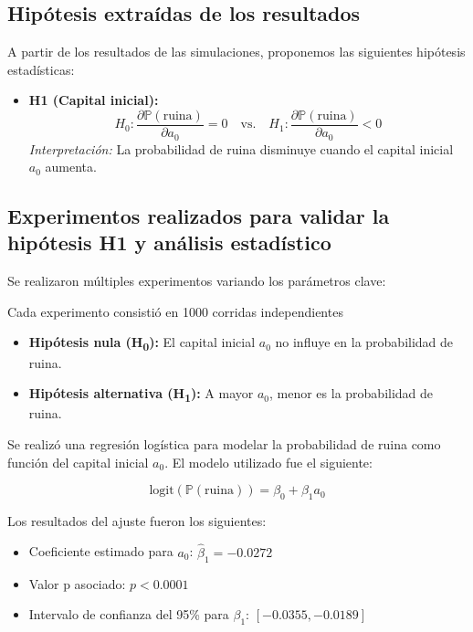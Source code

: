 \documentclass{article}
\begin{document}
\subsection{Hipótesis extraídas de los resultados}

A partir de los resultados de las simulaciones, proponemos las siguientes hipótesis estadísticas:

\begin{itemize}
    \item \textbf{H1 (Capital inicial):}
    \[
    H_0: \frac{\partial \mathbb{P}(\text{ruina})}{\partial a_0} = 0 
    \quad \text{vs.} \quad 
    H_1: \frac{\partial \mathbb{P}(\text{ruina})}{\partial a_0} < 0
    \]
    \textit{Interpretación:} La probabilidad de ruina disminuye cuando el capital inicial \( a_0 \) aumenta.
\end{itemize}

\subsection{Experimentos realizados para validar la hipótesis H1 y análisis estadístico}

Se realizaron múltiples experimentos variando los parámetros clave:


Cada experimento consistió en 1000 corridas independientes

\begin{itemize}
    \item \textbf{Hipótesis nula (H\textsubscript{0}):} El capital inicial \( a_0 \) no influye en la probabilidad de ruina.
    \item \textbf{Hipótesis alternativa (H\textsubscript{1}):} A mayor \( a_0 \), menor es la probabilidad de ruina.
\end{itemize}

Se realizó una regresión logística para modelar la probabilidad de ruina como función del capital inicial \( a_0 \). El modelo utilizado fue el siguiente:

\[
\text{logit}(\mathbb{P}(\text{ruina})) = \beta_0 + \beta_1 a_0
\]

Los resultados del ajuste fueron los siguientes:

\begin{itemize}
    \item Coeficiente estimado para \( a_0 \): \( \hat{\beta}_1 = -0.0272 \)
    \item Valor p asociado: \( p < 0.0001 \)
    \item Intervalo de confianza del 95\% para \( \beta_1 \): \([-0.0355, -0.0189]\)
\end{itemize}
\end{document}
